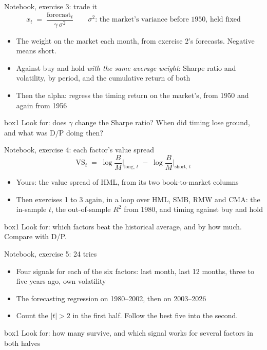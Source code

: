 \documentclass[aspectratio=169,10pt]{beamer}
\begin{document}
\begin{frame}{Notebook, exercise 3: trade it}
\[ x_{t} \;=\; \frac{\text{forecast}_{t}}{\gamma\,\sigma^{2}} \qquad \sigma^{2}\text{: the market's variance before 1950, held fixed} \]
\vskip 2pt
\begin{itemize}
\item The weight on the market each month, from exercise 2's forecasts. Negative means short.
\vskip 6pt
\item Against buy and hold \emph{with the same average weight}: Sharpe ratio and volatility, by period, and the cumulative return of both
\vskip 6pt
\item Then the alpha: regress the timing return on the market's, from 1950 and again from 1956
\end{itemize}
\vskip 12pt
\begin{beamercolorbox}[rounded=true,sep=7pt,center]{box1}
Look for: does $\gamma$ change the Sharpe ratio? When did timing lose ground, and what was D/P doing then?
\end{beamercolorbox}
\end{frame}

\begin{frame}{Notebook, exercise 4: each factor's value spread}
\[ \text{VS}_{t} \;=\; \log \frac{B}{M}\Big|_{\text{long},\,t} \;-\; \log \frac{B}{M}\Big|_{\text{short},\,t} \]
\vskip 2pt
\begin{itemize}
\item Yours: the value spread of HML, from its two book-to-market columns
\vskip 6pt
\item Then exercises 1 to 3 again, in a loop over HML, SMB, RMW and CMA: the in-sample $t$, the out-of-sample $R^{2}$ from 1980, and timing against buy and hold
\end{itemize}
\vskip 12pt
\begin{beamercolorbox}[rounded=true,sep=7pt,center]{box1}
Look for: which factors beat the historical average, and by how much. Compare with D/P.
\end{beamercolorbox}
\end{frame}

\begin{frame}{Notebook, exercise 5: 24 tries}
\vskip 4pt
\begin{itemize}
\item Four signals for each of the six factors: last month, last 12 months, three to five years ago, own volatility
\vskip 6pt
\item The forecasting regression on 1980--2002, then on 2003--2026
\vskip 6pt
\item Count the $|t| > 2$ in the first half. Follow the best five into the second.
\end{itemize}
\vskip 14pt
\begin{beamercolorbox}[rounded=true,sep=7pt,center]{box1}
Look for: how many survive, and which signal works for several factors in both halves
\end{beamercolorbox}
\end{frame}
\end{document}
